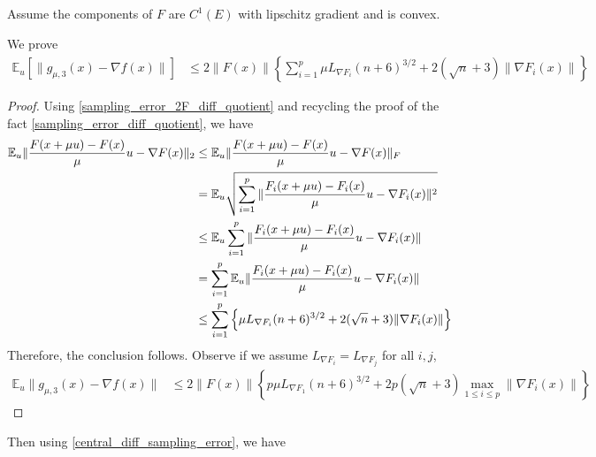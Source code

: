 \documentclass{article}
\begin{document}
Assume the components of $F$ are $C^1(E)$ with lipschitz gradient and is convex. \newline 

\begin{theorem}

We prove
\begin{align}
\mathbb{E}_u[\| g_{\mu,3}(x) - \nabla f(x)\|] & \leq 2\|F(x)\|\left\{\sum_{i=1}^p \mu L_{\nabla F_i}(n+6)^{3/2} + 2(\sqrt{n} + 3)\|\nabla F_i(x)\|\right\}
\end{align}
\begin{proof}
Using \eqref{sampling_error_2F_diff_quotient} and recycling the proof of the fact \eqref{sampling_error_diff_quotient}, we have 
\begin{align}
\mathbb{E}_u\| \frac{F(x+\mu u) - F(x)}{\mu}u - \nabla F(x) \|_2 & \leq \mathbb{E}_u\| \frac{F(x+\mu u) - F(x)}{\mu}u - \nabla F(x)\|_F \notag \\ & = \mathbb{E}_u\sqrt{\sum_{i=1}^p\| \frac{F_i(x+\mu u) - F_i(x)}{\mu}u - \nabla F_i(x) \|^2} \notag \\ & \leq \mathbb{E}_u \sum_{i=1}^p \| \frac{F_i(x+\mu u) - F_i(x)}{\mu}u - \nabla F_i(x)\| \notag \\ & = \sum_{i=1}^p \mathbb{E}_u\| \frac{F_i(x+\mu u) - F_i(x)}{\mu}u - \nabla F_i(x)\| \notag \\ & \leq \sum_{i=1}^p\left\{\mu L_{\nabla F_i}(n+6)^{3/2} + 2(\sqrt{n} + 3)\|\nabla F_i(x)\| \right\}
\end{align}
Therefore, the conclusion follows. Observe if we assume $L_{\nabla F_i} = L_{\nabla F_j}$ for all $i,j$, 
\begin{align}
\mathbb{E}_u\|g_{\mu,3}(x) - \nabla f(x)\| & \leq 2\|F(x)\|\left\{p\mu L_{\nabla F_1}(n+6)^{3/2} + 2p(\sqrt{n}+3)\max_{1 \leq i \leq p}\|\nabla F_i(x)\| \right\}
\end{align}
\end{proof}

\end{theorem}

Then using \eqref{central_diff_sampling_error}, we have
\end{document}

